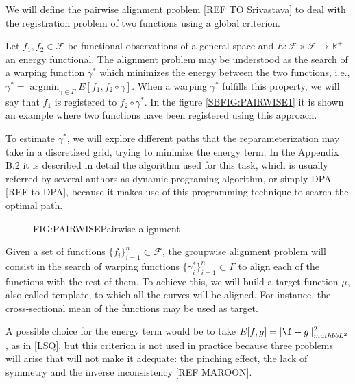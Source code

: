 
We will define the pairwise alignment problem [REF TO Srivastava] to deal with
the registration problem of two functions using a global criterion.

Let $f_1, f_2 \in \mathcal{F}$ be functional observations of a general space
 and $E: \mathcal{F} \times \mathcal{F} \rightarrow \mathbb{R}^+$ an energy
functional. The alignment problem may be understood as the search of a warping
function $\gamma^*$ which minimizes the energy between the two functions, i.e.,
$\gamma^* = \operatorname{argmin}_{\gamma \in \Gamma} E[f_1, f_2 \circ \gamma]$.
When a warping $\gamma^*$ fulfills this property, we will say that $f_1$ is
registered to $f_2 \circ \gamma^*$. In the figure \ref{SBFIG:PAIRWISE1} it is
shown an example where two functions have been registered using this approach.

To estimate $\gamma^*$, we will explore different paths that the
reparameterization may take in a discretized grid, trying to minimize the energy
term. In the Appendix B.2 it is described in detail the algorithm used for this
task, which is usually referred by several authors as dynamic programing
algorithm, or simply DPA [REF to DPA], because it makes use of this programming
technique to search the optimal path.

\begin{figure}[Pairwise alignment]{FIG:PAIRWISE}{Pairwise alignment}
   \quad
\end{figure}

Given a set of functions $\{f_i\}_{i=1}^n \subset \mathcal{F}$, the
groupwise alignment problem will consist in the search of warping functions
$\{\gamma_i^* \}_{i=1}^n \subset \Gamma$ to align each of the functions with the
rest of them. To achieve this, we will build a target function $\mu$, also
called template, to which all the curves will be aligned. For instance,
the cross-sectional mean of the functions may be used as target.

A possible choice for the energy term would be to take
$E[f,g]= |\f - g\|_{mathbb{L}^2}^2$, as in \ref{LSQ}, but
this criterion is not used in practice because three
problems will arise that will not make it adequate: the pinching effect, the
lack of symmetry and the inverse inconsistency [REF MAROON].
